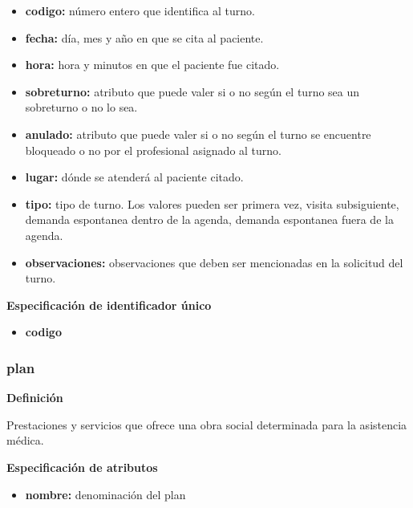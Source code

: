 \documentclass[a4paper,11pt]{article}
\begin{document}
\begin{itemize}

     \item \textbf{codigo:} número entero que identifica al turno.

     \item \textbf{fecha:} día, mes y año en que se cita al paciente.

     \item \textbf{hora:} hora y minutos en que el paciente fue citado.

     \item \textbf{sobreturno:} atributo que puede valer si o no según el turno sea un sobreturno 
     o no lo sea.

     \item \textbf{anulado:} atributo que puede valer si o no según el turno se encuentre bloqueado 
     o no por el profesional asignado al turno.

     \item \textbf{lugar:} dónde se atenderá al paciente citado.

     \item \textbf{tipo:} tipo de turno. Los valores pueden ser primera vez, visita subsiguiente, 
     demanda espontanea dentro de la agenda, demanda espontanea fuera de la agenda.

     \item \textbf{observaciones:} observaciones que deben ser mencionadas en la solicitud del turno.

\end{itemize}

\textbf{Especificación de identificador único}

\begin{itemize}

     \item \textbf{codigo}

\end{itemize}

\subsubsection{\textbf{plan}}

\textbf{Definición}

Prestaciones y servicios que ofrece una obra social determinada para la asistencia médica.

\textbf{Especificación de atributos}

\begin{itemize}

     \item \textbf{nombre:} denominación del plan

\end{itemize}
\end{document}
